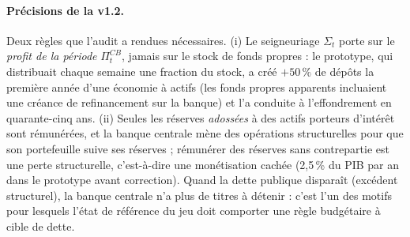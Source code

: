 \documentclass[11pt,a4paper]{article}
\begin{document}
\begin{lecture}
\paragraph{Précisions de la v1.2.} Deux règles que l'audit a rendues nécessaires. (i) Le seigneuriage $\Sigma_t$ porte sur le \emph{profit de la période} $\Pi^{CB}_t$, jamais sur le stock de fonds propres : le prototype, qui distribuait chaque semaine une fraction du stock, a créé $+50\,\%$ de dépôts la première année d'une économie à actifs (les fonds propres apparents incluaient une créance de refinancement sur la banque) et l'a conduite à l'effondrement en quarante-cinq ans. (ii) Seules les réserves \emph{adossées} à des actifs porteurs d'intérêt sont rémunérées, et la banque centrale mène des opérations structurelles pour que son portefeuille suive ses réserves ; rémunérer des réserves sans contrepartie est une perte structurelle, c'est-à-dire une monétisation cachée (2,5\,\% du PIB par an dans le prototype avant correction). Quand la dette publique disparaît (excédent structurel), la banque centrale n'a plus de titres à détenir : c'est l'un des motifs pour lesquels l'état de référence du jeu doit comporter une règle budgétaire à cible de dette.
\end{lecture}
\end{document}
